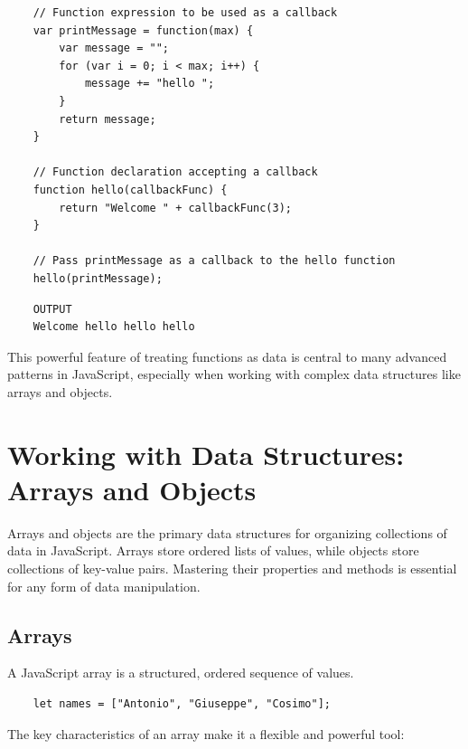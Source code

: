 \documentclass{scrbook}
\begin{document}
\begin{lstlisting}
    // Function expression to be used as a callback
    var printMessage = function(max) {
        var message = "";
        for (var i = 0; i < max; i++) {
            message += "hello ";
        }
        return message;
    }
    
    // Function declaration accepting a callback
    function hello(callbackFunc) {
        return "Welcome " + callbackFunc(3);
    }
    
    // Pass printMessage as a callback to the hello function
    hello(printMessage);
\end{lstlisting}

\begin{lstlisting}
    OUTPUT
    Welcome hello hello hello
\end{lstlisting}

This powerful feature of treating functions as data is central to many advanced patterns in JavaScript, especially when working with complex data structures like arrays and objects.

\chapter{Working with Data Structures: Arrays and Objects}

Arrays and objects are the primary data structures for organizing collections of data in JavaScript. Arrays store ordered lists of values, while objects store collections of key-value pairs. Mastering their properties and methods is essential for any form of data manipulation.

\section{Arrays}

A JavaScript array is a structured, ordered sequence of values.

\begin{lstlisting}
    let names = ["Antonio", "Giuseppe", "Cosimo"];
\end{lstlisting}

The key characteristics of an array make it a flexible and powerful tool:
\end{document}
